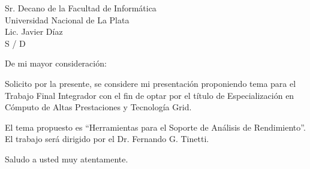 \documentclass[a4paper]{letter}
\date{C\'ordoba, Noviembre del 2012}
\begin{document}
\begin{letter}{Sr. Decano de la Facultad de Inform\'atica\\
Universidad Nacional de La Plata\\
Lic. Javier D\'iaz\\
S / D}

\opening{De mi mayor consideraci\'on:}

Solicito por la presente, se considere mi presentaci\'on proponiendo tema para
el Trabajo Final Integrador con el fin de optar por el t\'itulo de
 Especializaci\'on en C\'omputo de Altas Prestaciones y Tecnolog\'ia Grid.

El tema propuesto es ``Herramientas para el Soporte de An\'alisis de
 Rendimiento''. El trabajo ser\'a dirigido por el Dr. Fernando G. Tinetti.

\closing{Saludo a usted muy atentamente.}

\end{letter}
\end{document}
